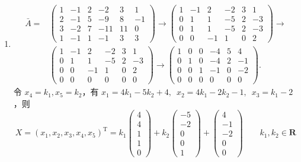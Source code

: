 \begin{enumerate}
    \item \begin{align*}
              \bar{A} ={} &
              \begin{pmatrix}
                  1 & -1 & 2 & -2  & 3  & 1  \\
                  2 & -1 & 5 & -9  & 8  & -1 \\
                  3 & -2 & 7 & -11 & 11 & 0  \\
                  1 & -1 & 1 & -1  & 3  & 3
              \end{pmatrix}
              \rightarrow
              \begin{pmatrix}
                  1 & -1 & 2  & -2 & 3 & 1  \\
                  0 & 1  & 1  & -5 & 2 & -3 \\
                  0 & 1  & 1  & -5 & 2 & -3 \\
                  0 & 0  & -1 & 1  & 0 & 2
              \end{pmatrix} \rightarrow \\
                          &
              \begin{pmatrix}
                  1 & -1 & 2  & -2 & 3 & 1  \\
                  0 & 1  & 1  & -5 & 2 & -3 \\
                  0 & 0  & -1 & 1  & 0 & 2  \\
                  0 & 0  & 0  & 0  & 0 & 0
              \end{pmatrix}
              \rightarrow
              \begin{pmatrix}
                  1 & 0 & 0 & -4 & 5 & 4  \\
                  0 & 1 & 0 & -4 & 2 & -1  \\
                  0 & 0 & 1 & -1 & 0 & -2 \\
                  0 & 0 & 0 & 0  & 0 & 0
              \end{pmatrix}.
          \end{align*}
          令 $ x_4 = k_1, x_5 = k_2 $，有 $x_1 = 4k_1 - 5k_2 + 4,\enspace\allowbreak x_2 = 4k_1 - 2k_2 - 1,\enspace\allowbreak x_3 = k_1 -2 $，则
          \[ X = (x_1, x_2, x_3, x_4, x_5)^\mathrm{T} = k_1 \begin{pmatrix} 4 \\ 4 \\ 1 \\ 1 \\ 0 \end{pmatrix} + k_2 \begin{pmatrix} -5 \\ -2 \\ 0 \\ 0 \\ 1 \end{pmatrix} + \begin{pmatrix} 4 \\ -1 \\ -2 \\ 0 \\ 0 \end{pmatrix} \qquad k_1, k_2 \in \mathbf{R} \]


\end{enumerate}
